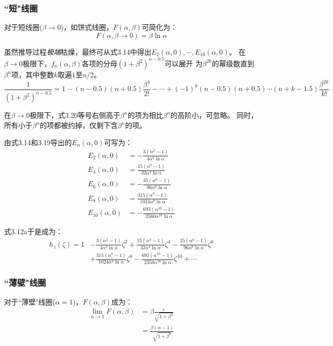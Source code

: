 \subsubsection{``短"线圈}
对于短线圈($\beta\rightarrow 0 $)，如饼式线圈，$F(\alpha,\beta)$可简化为：
\begin{equation}
  F(\alpha,\beta\rightarrow 0)=\beta \ln\alpha
\end{equation}

虽然推导过程\textit{极端}枯燥，最终可从式3.14中得出$E_2(\alpha,0),\cdots,E_{10}(\alpha,0)$。
在$\beta\rightarrow 0$极限下，$f_n(\alpha,\beta)$各项的分母$(1+\beta^2)^{n-0.5}$可以展开
为$\beta^{2k}$的幂级数直到$\beta^n$项，其中整数$k$取遍$1$至$n/2$。
\begin{equation}
 \frac{1}{(1+\beta^2)^{n-0.5}}=1-(n-0.5)(n+0.5)\frac{\beta^4}{2!}-\cdots+(-1)^k (n-0.5)(n+0.5)\cdots(n+k-1.5)\frac{\beta^{2k}}{k!}
\end{equation}

在$\beta\rightarrow 0$极限下，式3.20等号右侧高于$\beta^n$的项为相比$\beta^n$的高阶小，可忽略。
同时，所有小于$\beta^n$的项都被约掉，仅剩下含$\beta^n$的项。

由式3.14和3.19导出的$E_n(\alpha,0)$可写为：
\begin{subequations}
	\begin{align}
  E_2(\alpha,0) &= -\frac{3(\alpha^2-1)}{4\alpha^2 \ln \alpha} \\ 
  E_4(\alpha,0) &= \frac{15(\alpha^4-1)}{32\alpha^4 \ln \alpha} \\ 
  E_6(\alpha,0) &= -\frac{35(\alpha^6-1)}{96\alpha^6\ln \alpha} \\ 
  E_8(\alpha,0) &= \frac{315(\alpha^8-1)}{1024\alpha^8 \ln \alpha} \\
    E_{10}(\alpha,0) &= -\frac{693(\alpha^{10}-1)}{2560\alpha^{10} \ln \alpha}
    \end{align}
\end{subequations}

式3.12a于是成为：
\begin{align}
  h_z(\zeta)=1&-\frac{3(\alpha^2-1)}{4\alpha^2 \ln \alpha}\zeta^2+\frac{15(\alpha^4-1)}{32\alpha^4 \ln \alpha}\zeta^4 -\frac{35(\alpha^6-1)}{96\alpha^6\ln \alpha}\zeta^6\\
  &+\frac{315(\alpha^8-1)}{1024\alpha^8\ln \alpha}\zeta^8-\frac{693(\alpha^{10}-1)}{2350\alpha^{10}\ln \alpha}\zeta^{10}+\cdots
\end{align}

\subsubsection{``薄壁"线圈}
对于``薄壁"线圈($\alpha=1$)，$F(\alpha,\beta)$成为：
\begin{subequations}
\begin{align}
  \lim_{\alpha\rightarrow 1} F(\alpha,\beta)&=\beta\frac{\epsilon}{\sqrt{1+\beta^2}}\\
  &=\frac{\beta(\alpha-1)}{\sqrt{1+\beta^2}}
\end{align}
\end{subequations}

